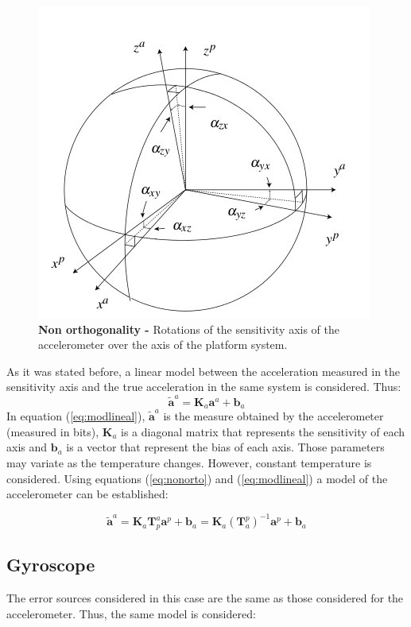 \documentclass[conference]{IEEEtran}
\newcommand{\refp}[1]{(\ref{#1})}
\begin{document}
\begin{figure}
	\centering
	\includegraphics[width=.6\columnwidth]{./pics_paper/ejes_acc.jpg}
	\caption{\textbf{Non orthogonality -} Rotations of the sensitivity axis of the accelerometer over the axis of the platform system.}
	\label{fig:nonorto}
\end{figure}

As it was stated before, a linear model between the acceleration measured in the sensitivity axis and the true acceleration in the same system is considered. Thus:
\begin{equation}
\tilde{\mathbf{a}}^a = \mathbf{K}_a\mathbf{a}^a + \mathbf{b}_a
\label{eq:modlineal}
\end{equation}
In equation \refp{eq:modlineal}, $\tilde{\mathbf{a}}^a$ is the measure obtained by the accelerometer (measured in bits), $\mathbf{K}_a$ is a diagonal matrix that represents the sensitivity of each axis and $\mathbf{b}_a$ is a vector that represent the bias of each axis. Those parameters may variate as the temperature changes. However, constant temperature is considered. Using equations \refp{eq:nonorto} and \refp{eq:modlineal} a model of the accelerometer can be established:

\begin{equation}
\tilde{\mathbf{a}}^a = \mathbf{K}_a\mathbf{T}_p^a\mathbf{a}^p + \mathbf{b}_a = \mathbf{K}_a(\mathbf{T}_a^p)^{-1}\mathbf{a}^p + \mathbf{b}_a 
\end{equation}


\subsection{Gyroscope}
The error sources considered in this case are the same as those considered for the accelerometer. Thus, the same model is considered:
\end{document}
